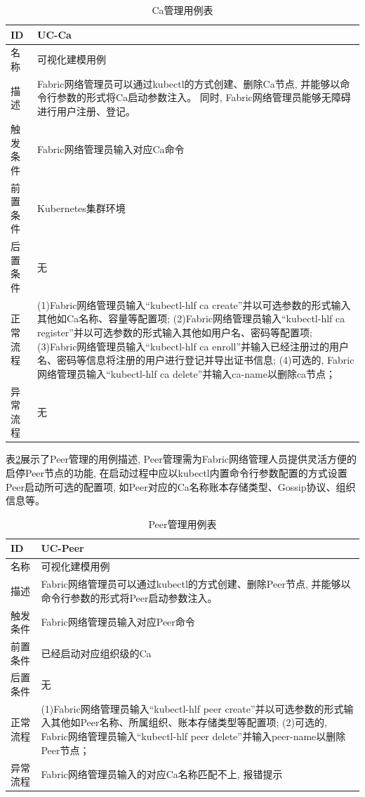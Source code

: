 {\footnotesize
\begin{longtable}[h]{m{60pt}|m{280pt}}
    \caption[Ca管理用例表]{Ca管理用例表} \label{ca_use_case} \\
        \hline  
        ID&UC-Ca\\
        \hline
        名称&可视化建模用例\\
        \hline
        描述&Fabric网络管理员可以通过kubectl的方式创建、删除Ca节点, 并能够以命令行参数的形式将Ca启动参数注入。 同时, Fabric网络管理员能够无障碍进行用户注册、登记。\\
        \hline
        触发条件&Fabric网络管理员输入对应Ca命令\\
        \hline
        前置条件&Kubernetes集群环境\\
        \hline
        后置条件&无\\
        \hline
        正常流程& (1)Fabric网络管理员输入“kubectl-hlf ca create”并以可选参数的形式输入其他如Ca名称、容量等配置项;
        \newline (2)Fabric网络管理员输入“kubectl-hlf ca register”并以可选参数的形式输入其他如用户名、密码等配置项;
        \newline (3)Fabric网络管理员输入“kubectl-hlf ca enroll”并输入已经注册过的用户名、密码等信息将注册的用户进行登记并导出证书信息;
        \newline (4)可选的, Fabric网络管理员输入“kubectl-hlf ca delete”并输入ca-name以删除ca节点；\\
        \hline
        异常流程&无\\
        \hline
    \end{longtable} 
}


表\ref{peer_use_case}展示了Peer管理的用例描述, Peer管理需为Fabric网络管理人员提供灵活方便的启停Peer节点的功能, 在启动过程中应以kubectl内置命令行参数配置的方式设置Peer启动所可选的配置项, 如Peer对应的Ca名称账本存储类型、Gossip协议、组织信息等。

{\footnotesize
\begin{longtable}[h]{m{60pt}|m{280pt}}
    \caption[Peer管理用例表]{Peer管理用例表} \label{peer_use_case} \\
        \hline  
        ID&UC-Peer\\
        \hline
        名称&可视化建模用例\\
        \hline
        描述&Fabric网络管理员可以通过kubectl的方式创建、删除Peer节点, 并能够以命令行参数的形式将Peer启动参数注入。\\
        \hline
        触发条件&Fabric网络管理员输入对应Peer命令\\
        \hline
        前置条件&已经启动对应组织级的Ca\\
        \hline
        后置条件&无\\
        \hline
        正常流程& (1)Fabric网络管理员输入“kubectl-hlf peer create”并以可选参数的形式输入其他如Peer名称、所属组织、账本存储类型等配置项;
        \newline (2)可选的, Fabric网络管理员输入“kubectl-hlf peer delete”并输入peer-name以删除Peer节点；\\
        \hline
        异常流程& Fabric网络管理员输入的对应Ca名称匹配不上, 报错提示\\
        \hline
    \end{longtable} 
}

